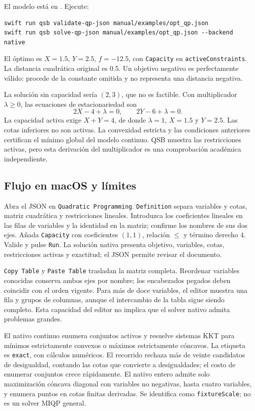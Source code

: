 El modelo está en . Ejecute:
\begin{lstlisting}
swift run qsb validate-qp-json manual/examples/opt_qp.json
swift run qsb solve-qp-json manual/examples/opt_qp.json --backend native
\end{lstlisting}
El óptimo es \(X=1.5\), \(Y=2.5\), \(f=-12.5\), con
\texttt{Capacity} en \texttt{activeConstraints}. La distancia cuadrática
original es 0.5. Un objetivo negativo es perfectamente válido: procede de la
constante omitida y no representa una distancia negativa.

La solución sin capacidad sería \((2,3)\), que no es factible. Con multiplicador
\(\lambda\geq0\), las ecuaciones de estacionariedad son
\[
 2X-4+\lambda=0,\qquad2Y-6+\lambda=0.
\]
La capacidad activa exige \(X+Y=4\), de donde \(\lambda=1\), \(X=1.5\) y
\(Y=2.5\). Las cotas inferiores no son activas. La convexidad estricta y las
condiciones anteriores certifican el mínimo global del modelo continuo.
QSB muestra las restricciones activas, pero esta derivación del multiplicador
es una comprobación académica independiente.

\subsection{Flujo en macOS y límites}
Abra el JSON en \texttt{Quadratic Programming}. \texttt{Definition} separa
variables y cotas, matriz cuadrática y restricciones lineales. Introduzca
los coeficientes lineales en las filas de variables y la identidad en la
matriz; confirme los nombres de sus dos ejes. Añada \texttt{Capacity} con
coeficientes \((1,1)\), relación \(\leq\) y término derecho 4. Valide y
pulse \texttt{Run}. La solución nativa presenta objetivo, variables, cotas,
restricciones activas y exactitud; el JSON permite revisar el documento.

\texttt{Copy Table} y \texttt{Paste Table} trasladan la matriz completa.
Reordenar variables conocidas conserva ambos ejes por nombre; los encabezados
pegados deben coincidir con el orden vigente. Para más de doce variables,
el editor muestra una fila y grupos de columnas, aunque el intercambio de
la tabla sigue siendo completo. Esta capacidad del editor no implica que el
solver nativo admita problemas grandes.

El nativo continuo enumera conjuntos activos y resuelve sistemas KKT para
mínimos estrictamente convexos o máximos estrictamente cóncavos. La etiqueta
es \texttt{exact}, con cálculos numéricos. El recorrido rechaza más de veinte
candidatos de desigualdad, contando las cotas que convierte a desigualdades;
el costo de enumerar conjuntos crece rápidamente. El nativo entero admite
solo maximización cóncava diagonal con variables no negativas, hasta cuatro
variables, y enumera puntos en cotas finitas derivadas. Se identifica como
\texttt{fixtureScale}; no es un solver MIQP general.

